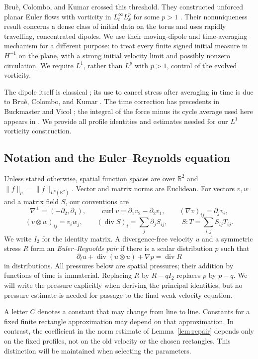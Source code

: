 \documentclass[11pt,a4paper,reqno]{amsart}
\theoremstyle{plain}
\theoremstyle{definition}
\theoremstyle{remark}
\numberwithin{equation}{section}
\newcommand{\R}{\mathbb R}
\newcommand{\curl}{\operatorname{curl}}
\newcommand{\Div}{\operatorname{div}}
\begin{document}
Bru\`e, Colombo, and Kumar crossed this threshold. They constructed
unforced planar Euler flows with vorticity in
$L^\infty_tL^p_x$ for some $p>1$
\cite[Theorems~1.1--1.3]{BCK}. Their nonuniqueness result concerns a
dense class of initial data on the torus and uses rapidly travelling,
concentrated dipoles. We use their moving-dipole and time-averaging
mechanism for a different purpose: to treat every finite signed
initial measure in $H^{-1}$ on the plane, with a strong initial
velocity limit and possibly nonzero circulation. We require $L^1$,
rather than $L^p$ with $p>1$, control of the evolved vorticity.

The dipole itself is classical \cite{Chaplygin,Lamb}; its use to
cancel stress after averaging in time is due to Bru\`e, Colombo, and
Kumar \cite[\S\S1.2, 2.2, 4.7--4.8]{BCK}. The time correction has
precedents in Buckmaster and Vicol
\cite[\S4.3, (4.20)]{BuckmasterVicol}; the integral of the force
minus its cycle average used here appears in
\cite[(4.76)--(4.78)]{BCK}. We provide all profile identities and
estimates needed for our $L^1$ vorticity construction.

\subsection{Notation and the Euler--Reynolds equation}

Unless stated otherwise, spatial function spaces are over $\R^2$ and
$\|f\|_p=\|f\|_{L^p(\R^2)}$. Vector and matrix norms are Euclidean.
For vectors $v,w$ and a matrix field $S$, our conventions are
\[
 \nabla^\perp=(-\partial_2,\partial_1),\qquad
 \curl v=\partial_1v_2-\partial_2v_1,\qquad
 (\nabla v)_{ij}=\partial_jv_i,
\]
\[
 (v\otimes w)_{ij}=v_iw_j,\qquad
 (\Div S)_i=\sum_j\partial_jS_{ij},\qquad
 S:T=\sum_{i,j}S_{ij}T_{ij}.
\]
We write $I_2$ for the identity matrix. A divergence-free velocity $u$
and a symmetric stress $R$ form an \emph{Euler--Reynolds pair} if
there is a scalar distribution $p$ such that
\begin{equation}\label{eq:ER}
 \partial_tu+\Div(u\otimes u)+\nabla p=\Div R
\end{equation}
in distributions. All pressures below are spatial pressures; their
addition by functions of time is immaterial. Replacing $R$ by
$R-qI_2$ replaces $p$ by $p-q$. We will write the pressure explicitly
when deriving the principal identities, but no pressure estimate is
needed for passage to the final weak velocity equation.

A letter $C$ denotes a constant that may change from line to line.
Constants for a fixed finite rectangle approximation may depend on
that approximation. In contrast, the coefficient in the norm estimate
of Lemma~\ref{lem:repair} depends only on the fixed profiles, not on
the old velocity or the chosen rectangles. This distinction will be
maintained when selecting the parameters.
\end{document}
